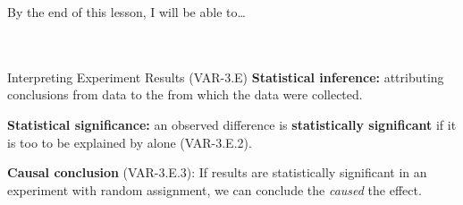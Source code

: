 \documentclass[10pt]{article}
\begin{document}
\namedateperiod

\vspace{0.12in}

\begin{objectivebox}
\small By the end of this lesson, I will be able to\dots\\[4pt]
\writeline\\[1pt]
\writeline\\[1pt]
\writeline
\end{objectivebox}

\vspace{0.1in}

\begin{vocabbox}
\end{vocabbox}

\vspace{0.1in}

\begin{notesbox}{Interpreting Experiment Results (VAR-3.E)}
\small
\textbf{Statistical inference:} attributing conclusions from data to the
\blank{6cm} from which the data were collected.

\vspace{8pt}
\textbf{Statistical significance:} an observed difference is \textbf{statistically
significant} if it is too \blank{3cm} to be explained by \blank{3cm} alone
(VAR-3.E.2).

\vspace{8pt}
\textbf{Causal conclusion} (VAR-3.E.3): If results are statistically significant in
an experiment with random assignment, we can conclude the \blank{5cm} \emph{caused}
the effect.
\end{notesbox}

\vspace{0.1in}
\end{document}
